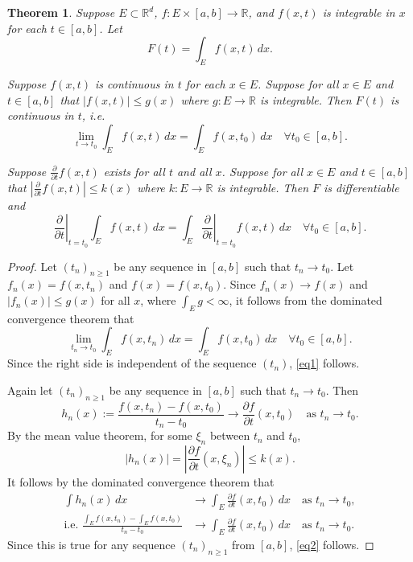 \documentclass[a4paper]{amsart}
\theoremstyle{plain}
\newtheorem*{theorem*}{Theorem}
\theoremstyle{definition}
\theoremstyle{remark}
\begin{document}
\begin{theorem*}
Suppose $ E \subset \mathbb{R}^d  $, $ f: E\times [a,b] \to \mathbb{R} $, and $ f(x, t) $ is integrable in $ x $ for each $ t \in [a,b] $. Let
\[
 F(t) = \int_E f(x,t)\, dx .
 \]

Suppose $  f(x,t) $ is continuous in $ t $ for each $ x\in E  $.  Suppose for all $ x\in E  $ and $ t \in [a,b] $ that $ |f(x,t)|\leq g(x) $ where  $ g : E \to \mathbb{R} $  is integrable.  Then $ F(t) $ is continuous in $ t $, i.e.
\begin{equation} \label{eq1} 
     \lim_{t\to t_0} \int_E f(x,t)\, dx = \int_E f(x,t_0)\, dx \quad \forall t_0\in [a,b] .
\end{equation} 
     
Suppose    $  \frac{\partial}{\partial t} f(x ,t)  $ exists for all $ t $ and all $ x $.  Suppose for all $ x\in E  $ and $ t \in [a,b] $ that $\left| \frac{\partial}{\partial t} f(x ,t)\right| \leq k(x) $ where  $ k : E \to \mathbb{R} $  is integrable.   Then $ F $ is differentiable and 
\begin{equation} \label{eq2} 
\left.\frac{\partial}{\partial t}\right|_{t=t_0}  \int_E f(x,t)\, dx =  \int_E \left.\frac{\partial}{\partial t}\right|_{t=t_0} f(x,t)\, dx \quad \forall t_0\in [a,b] .
\end{equation} 
\end{theorem*} 

\begin{proof} Let $ (t_n)_{n\geq 1} $ be any sequence in $ [a,b] $ such that $ t_n \to t_0 $.  Let $ f_n(x) = f(x,t_n) $ and $ f(x) = f(x,t_0) $.  Since $ f_n(x) \to f(x) $ and $ |f_n(x)| \leq g(x) $ for all $ x $, where $ \int_E g <\infty $, it follows from  the dominated convergence theorem that 
\[ 
     \lim_{t_n\to t_0} \int_E f(x,t_n)\, dx = \int_E f(x,t_0)\, dx \quad \forall t_0\in [a,b] .
\]
Since the right side is independent of the sequence $ (t_n ) $, \eqref{eq1} follows.

\medskip  Again let $ (t_n)_{n\geq 1} $ be any sequence in $ [a,b] $ such that $ t_n \to t_0 $. 
Then 
\[
h_n(x) := \frac{f(x,t_n) - f(x,t_0)}{t_n - t_0} \to  \frac{\partial f}{\partial t} (x,t_0) \quad \text{as } t_n \to t_0 .
\]
By the mean value theorem, for some $ \xi_n $ between $ t_n $ and $t_0 $,
\[
|h_n(x) | = \left| \frac{\partial f}{\partial t} (x,\xi_n) \right| \leq k(x) .
\]
It follows by the dominated convergence theorem that
\begin{align*}
\int h_n(x)\,  d x    &\to  \int_E \frac{\partial f}{\partial t} (x,t_0)\, dx \quad \text{as } t_n \to t_0,  \\
\text{i.e.  } \frac{\int_E f(x,t_n) - \int_E f(x,t_0)}{t_n - t_0} &\to \int_E \frac{\partial f}{\partial t} (x,t_0)\, dx 
                                                \quad \text{as } t_n \to t_0  .
\end{align*} 
Since this is true for any sequence $ (t_n)_{n\geq 1} $ from $[a,b]$, \eqref{eq2} follows.
\end{proof}
\end{document}
